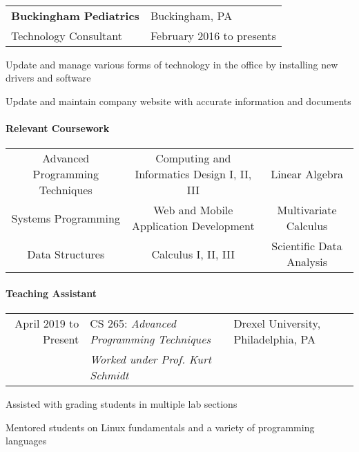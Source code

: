 \documentclass[10pt,]{article}
\let\oldparagraph\paragraph
\renewcommand{\paragraph}[1]{\oldparagraph{#1}\mbox{}}
\begin{document}
~

\begin{tabularx}{\textwidth}{l X}
    \textbf{Buckingham Pediatrics} & \hfill Buckingham, PA\\
    Technology Consultant          & \hfill February 2016 to presents
\end{tabularx}

\begin{list}{\quad}{}
    \item Update and manage various forms of technology in the office by installing new drivers and software
    \item Update and maintain company website with accurate information and documents
\end{list}

\hypertarget{relevant-coursework}{%
\paragraph{Relevant Coursework}\label{relevant-coursework}}

\begin{center}
    \begin{tabularx}{\textwidth}{ccc}
        Advanced Programming Techniques & Computing and Informatics Design I, II, III & Linear Algebra\\
        Systems Programming & Web and Mobile Application Development & Multivariate Calculus\\
        Data Structures & Calculus I, II, III & Scientific Data Analysis \\
    \end{tabularx}
\end{center}

\hypertarget{teaching-assistant}{%
\paragraph{Teaching Assistant}\label{teaching-assistant}}

\begin{tabularx}{\textwidth}{r | l X}
April 2019 to Present & CS 265: \textit{Advanced Programming Techniques} & \hfill Drexel University, Philadelphia, PA\\
           & \textit{Worked under Prof. Kurt Schmidt}
\end{tabularx}
\begin{list}{\quad}
    \item Assisted with grading students in multiple lab sections
    \item Mentored students on Linux fundamentals and a variety of programming languages
\end{list}
\end{document}
